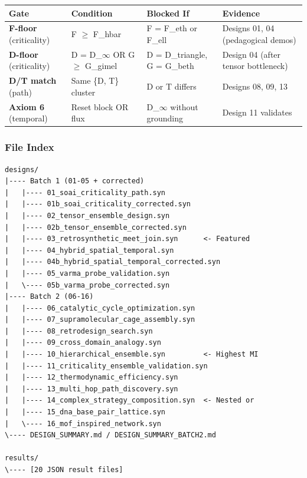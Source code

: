 \documentclass[12pt,a4paper]{article}
\begin{document}
\begin{table}[htbp]
\centering
\small
{}
\begin{tabularx}{\textwidth}{>{\centering\arraybackslash}X >{\centering\arraybackslash}X >{\centering\arraybackslash}X >{\centering\arraybackslash}X}
\toprule
\rowcolor{gray!25}\textbf{Gate} & \textbf{Condition} & \textbf{Blocked If} & \textbf{Evidence} \\
\midrule
\rowcolors{1}{white}{gray!10}
\textbf{F-floor} (criticality) & F $\geq$ F\_hbar & F = F\_eth or F\_ell & Designs 01, 04 (pedagogical demos) \\
\textbf{D-floor} (criticality) & D = D\_$\infty$ OR G $\geq$ G\_gimel & D = D\_triangle, G = G\_beth & Design 04 (after tensor bottleneck) \\
\textbf{D/T match} (path) & Same \{D, T\} cluster & D or T differs & Designs 08, 09, 13 \\
\textbf{Axiom 6} (temporal) & Reset block OR flux & D\_$\infty$ without grounding & Design 11 validates \\
\bottomrule
\end{tabularx}
\end{table}

\subsubsection{File Index}

\begin{lstlisting}
designs/
|---- Batch 1 (01-05 + corrected)
|   |---- 01_soai_criticality_path.syn
|   |---- 01b_soai_criticality_corrected.syn
|   |---- 02_tensor_ensemble_design.syn
|   |---- 02b_tensor_ensemble_corrected.syn
|   |---- 03_retrosynthetic_meet_join.syn      <- Featured
|   |---- 04_hybrid_spatial_temporal.syn
|   |---- 04b_hybrid_spatial_temporal_corrected.syn
|   |---- 05_varma_probe_validation.syn
|   \---- 05b_varma_probe_corrected.syn
|---- Batch 2 (06-16)
|   |---- 06_catalytic_cycle_optimization.syn
|   |---- 07_supramolecular_cage_assembly.syn
|   |---- 08_retrodesign_search.syn
|   |---- 09_cross_domain_analogy.syn
|   |---- 10_hierarchical_ensemble.syn         <- Highest MI
|   |---- 11_criticality_ensemble_validation.syn
|   |---- 12_thermodynamic_efficiency.syn
|   |---- 13_multi_hop_path_discovery.syn
|   |---- 14_complex_strategy_composition.syn  <- Nested or
|   |---- 15_dna_base_pair_lattice.syn
|   \---- 16_mof_inspired_network.syn
\---- DESIGN_SUMMARY.md / DESIGN_SUMMARY_BATCH2.md

results/
\---- [20 JSON result files]
\end{lstlisting}
\end{document}
